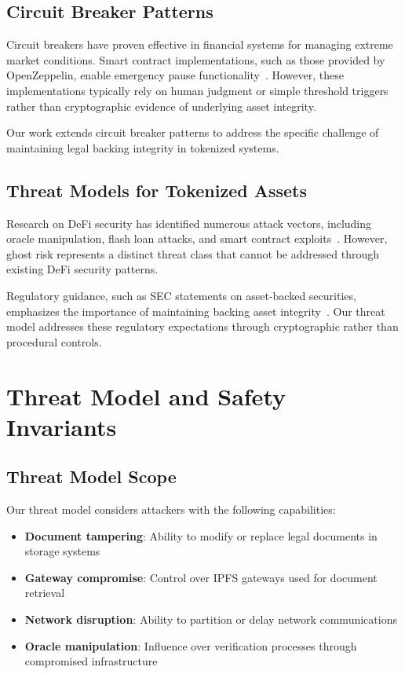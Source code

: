 \documentclass[10pt,conference]{IEEEtran}
\begin{document}
\subsection{Circuit Breaker Patterns}
\label{subsec:circuit_breakers}

Circuit breakers have proven effective in financial systems for managing extreme market conditions. Smart contract implementations, such as those provided by OpenZeppelin, enable emergency pause functionality~\cite{openzeppelin2023}. However, these implementations typically rely on human judgment or simple threshold triggers rather than cryptographic evidence of underlying asset integrity.

Our work extends circuit breaker patterns to address the specific challenge of maintaining legal backing integrity in tokenized systems.

\subsection{Threat Models for Tokenized Assets}
\label{subsec:threat_models}

Research on DeFi security has identified numerous attack vectors, including oracle manipulation, flash loan attacks, and smart contract exploits~\cite{werner2021sok}. However, ghost risk represents a distinct threat class that cannot be addressed through existing DeFi security patterns.

Regulatory guidance, such as SEC statements on asset-backed securities, emphasizes the importance of maintaining backing asset integrity~\cite{sec2023}. Our threat model addresses these regulatory expectations through cryptographic rather than procedural controls.

\section{Threat Model and Safety Invariants}
\label{sec:threat_model}

\subsection{Threat Model Scope}
\label{subsec:threat_scope}

Our threat model considers attackers with the following capabilities:

\begin{itemize}
\item \textbf{Document tampering}: Ability to modify or replace legal documents in storage systems
\item \textbf{Gateway compromise}: Control over IPFS gateways used for document retrieval
\item \textbf{Network disruption}: Ability to partition or delay network communications
\item \textbf{Oracle manipulation}: Influence over verification processes through compromised infrastructure
\end{itemize}
\end{document}
